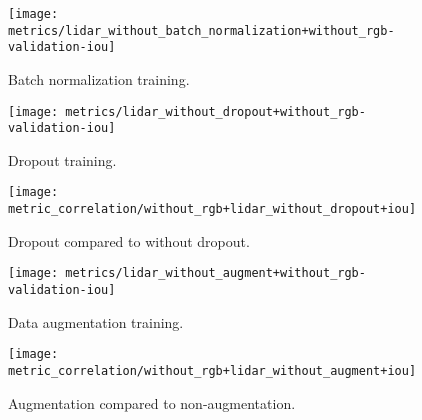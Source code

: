 
\begin{figure}[H]
  \centering
  \texttt{[image: metrics/lidar\_without\_batch\_normalization+without\_rgb-validation-iou]}
  \caption{%
    Batch normalization training.
  }
\end{figure}


\begin{figure}[H]
  \centering
  \texttt{[image: metrics/lidar\_without\_dropout+without\_rgb-validation-iou]}
  \caption{%
    Dropout training.
  }
\end{figure}

\begin{figure}[H]
  \centering
  \texttt{[image: metric\_correlation/without\_rgb+lidar\_without\_dropout+iou]}
  \caption{%
    Dropout compared to without dropout.
  }
\end{figure}


\begin{figure}[H]
  \centering
  \texttt{[image: metrics/lidar\_without\_augment+without\_rgb-validation-iou]}
  \caption{%
    Data augmentation training.
  }
\end{figure}

\begin{figure}[H]
  \centering
  \texttt{[image: metric\_correlation/without\_rgb+lidar\_without\_augment+iou]}
  \caption{%
    Augmentation compared to non-augmentation.
  }
\end{figure}
